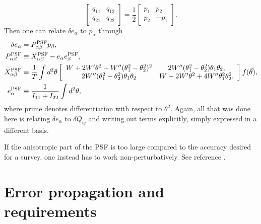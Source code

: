 \documentclass[11pt]{book}
\DeclareRobustCommand{\PSF}{\ifmmode\text{PSF}\else d\fi}
\begin{document}
\begin{equation}
	\begin{bmatrix}
		q_{11} & q_{12} \\ q_{21} & q_{22}
	\end{bmatrix}
	=
	\frac{1}{2}
	\begin{bmatrix}
		p_1 & p_2 \\ p_2 & -p_1
	\end{bmatrix}.
\end{equation}
Then one can relate $\delta e_\alpha$ to $p_\alpha$ through
\begin{align}
\delta e_\alpha&=P^{\PSF}_{\alpha \beta} p_\beta, \\
P^{\PSF}_{\alpha \beta}&\equiv X^{\PSF}_{\alpha \beta} - e_\alpha e^{\PSF}_\beta, \\
X^{\PSF}_{\alpha \beta}&\equiv\frac{1}{T}\int d^2\theta
\left[\begin{array}{cc}
W+2W' \theta^2 + W''(\theta_1^2-\theta_2^2)^2 & 2W''(\theta_1^2-\theta_2^2)
\theta_1\theta_2, \\
2W''(\theta_1^2-\theta_2^2)\theta_1\theta_2 & W+2W' \theta^2 + 4W''\theta_1^2
\theta_2^2,  \\
\end{array}\right]f(\vec\theta), \\
e^{\PSF}_\alpha&\equiv\frac{1}{I_{11}+I_{22}}\int d^2\theta ,
\end{align}
where prime denotes differentiation with respect to $\theta^2$. Again, all that was done here is relating $\delta e_\alpha$ to $\delta Q_{ij}$ and writing out terms explicitly, simply expressed in a different basis.

If the anisotropic part of the PSF is too large compared to the accuracy desired for a survey, one instead has to work non-perturbatively. See reference \cite{2000ApJ...537..555K}.

\section{Error propagation and requirements}
\label{sec:errorprop}
\end{document}
